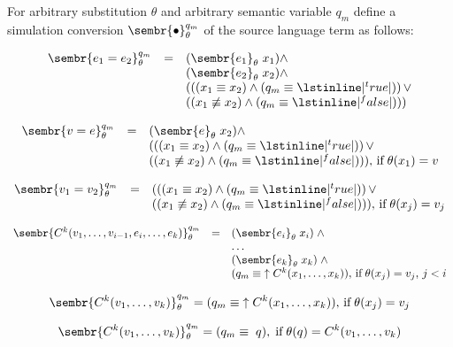 \begin{definition}
\normalfont For arbitrary substitution $\theta$ and arbitrary semantic variable $q_m$ define a simulation
conversion $\sembr{\bullet}^{q_m}_\theta$ of the source language term as follows:

$$
\begin{array}{rcl}
\sembr{e_1 = e_2}^{q_m}_\theta&=& (\sembr{e_1}_\theta\; x_1) \wedge \\
                           & & (\sembr{e_2}_\theta\; x_2) \wedge \\
                           & & (((x_1 \equiv x_2) \wedge (q_m \equiv \lstinline|^true|))\, \vee \\ 
                           & & ((x_1 \not \equiv x_2) \wedge (q_m \equiv \lstinline|^false|)))
\end{array}
$$

$$
\begin{array}{rcl}
\sembr{v = e}^{q_m}_\theta&=& (\sembr{e}_\theta\; x_2) \wedge \\
                        & & (((x_1 \equiv x_2) \wedge (q_m \equiv \lstinline|^true|))\, \vee \\ 
                        & & ((x_1 \not \equiv x_2) \wedge (q_m \equiv \lstinline|^false|))),\,\mbox{if}\;\theta(x_1)=v
\end{array}
$$

$$
\begin{array}{rcl}
\sembr{v_1 = v_2}^{q_m}_\theta&=& (((x_1 \equiv x_2) \wedge (q_m \equiv \lstinline|^true|))\, \vee \\ 
                           & & ((x_1 \not \equiv x_2) \wedge (q_m \equiv \lstinline|^false|))),\,\mbox{if}\;\theta(x_j)=v_j
\end{array}
$$

$$ 
\begin{array}{rcl}
\sembr{C^k(v_1, \ldots, v_{i-1}, e_i, \ldots, e_k)}^{q_m}_\theta&=&(\sembr{e_i}_\theta \; x_i) \; \wedge \\
       & & \ldots  \\
       & & (\sembr{e_k}_\theta \; x_k) \; \wedge \\
       & & (q_m \equiv\; \uparrow C^k(x_1, \ldots, x_k)),\,\mbox{if}\;\theta(x_j)=v_j,\,j<i
\end{array}
$$

$$ 
\sembr{C^k(v_1, \ldots, v_k)}^{q_m}_\theta = (q_m \equiv\; \uparrow C^k(x_1, \ldots, x_k)),\,\mbox{if}\;\theta(x_j)=v_j
$$

$$ 
\sembr{C^k(v_1, \ldots, v_k)}^{q_m}_\theta = (q_m \equiv\; q),\;\mbox{if}\;\theta(q)=C^k(v_1, \ldots, v_k)
$$


\end{definition}
